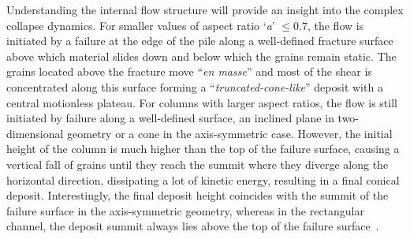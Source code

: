 Understanding the internal flow structure will provide an insight into the 
complex collapse dynamics. For smaller values of aspect ratio `\textit{a}' $\le 
0.7$, the flow is initiated by a failure at the edge of the pile along a 
well-defined fracture surface above which material slides down and below which 
the grains remain static. The grains located above the fracture move 
``\textit{en masse}'' and most of the shear is concentrated along this surface 
forming a ``\textit{truncated-cone-like}'' deposit with a central motionless 
plateau. For columns with larger aspect ratios, the flow is still initiated by 
failure along a well-defined surface, an inclined plane in two-dimensional 
geometry or a cone in the axis-symmetric case. However, the initial height of 
the column is much higher than the top of the failure surface, causing a 
vertical fall of grains until they reach the summit where they diverge along 
the horizontal direction, dissipating a lot of kinetic energy, resulting in a 
final conical deposit. Interestingly, the final deposit height coincides with 
the summit of the failure surface in the axis-symmetric geometry, whereas in 
the rectangular channel, the deposit summit always lies above the top of the 
failure surface~\citep{Lajeunesse2005}. 

